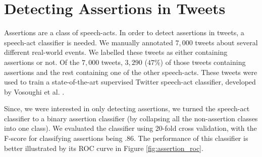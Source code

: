 \documentclass[letterpaper]{article}
\begin{document}
\section{Detecting Assertions in Tweets}
Assertions are a class of speech-acts. In order to detect assertions in tweets, a speech-act classifier is needed. We manually annotated $7,000$ tweets about several different real-world events. We labelled these tweets as either containing assertions or not. Of the $7,000$ tweets, $3,290$ ($47\%$) of those tweets containing assertions and the rest containing one of the other speech-acts. These tweets were used to train a state-of-the-art supervised Twitter speech-act classifier, developed by Vosoughi et al. \cite{vosoughi_act_2016}. %

Since, we were interested in only detecting assertions, we turned the speech-act classifier to a binary assertion classifier (by collapsing all the non-assertion classes into one class). We evaluated the classifier using 20-fold cross validation, with the F-score for classifying assertions being $.86$. The performance of this classifier is better illustrated by its ROC curve in Figure \ref{fig:assertion_roc}.


\end{document}
